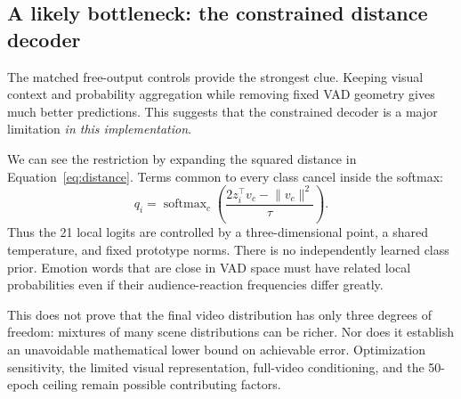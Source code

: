 \documentclass[11pt,a4paper]{article}
\newcommand{\softmax}{\operatorname{softmax}}
\begin{document}
\subsection{A likely bottleneck: the constrained distance decoder}
The matched free-output controls provide the strongest clue. Keeping visual context and probability aggregation while removing fixed VAD geometry gives much better predictions. This suggests that the constrained decoder is a major limitation \emph{in this implementation}.

We can see the restriction by expanding the squared distance in Equation~\ref{eq:distance}. Terms common to every class cancel inside the softmax:
\begin{equation}
q_i=\softmax_c\!\left(\frac{2z_i^\top v_c-\lVert v_c\rVert^2}{\tau}\right).
\end{equation}
Thus the 21 local logits are controlled by a three-dimensional point, a shared temperature, and fixed prototype norms. There is no independently learned class prior. Emotion words that are close in VAD space must have related local probabilities even if their audience-reaction frequencies differ greatly.

This does not prove that the final video distribution has only three degrees of freedom: mixtures of many scene distributions can be richer. Nor does it establish an unavoidable mathematical lower bound on achievable error. Optimization sensitivity, the limited visual representation, full-video conditioning, and the 50-epoch ceiling remain possible contributing factors.
\end{document}
